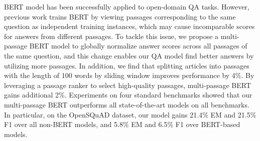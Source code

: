 BERT model has been successfully applied to open-domain QA tasks. However, previous work trains BERT by viewing passages corresponding to the same question as independent training instances, which may cause incomparable scores for answers from different passages. To tackle this issue, we propose a multi-passage BERT model to globally normalize answer scores across all passages of the same question, and this change enables our QA model find better answers by utilizing more passages. In addition, we find that splitting articles into passages with the length of 100 words by sliding window improves performance by 4\%. By leveraging a passage ranker to select high-quality passages, multi-passage BERT gains additional 2\%. Experiments on four standard benchmarks showed that our multi-passage BERT outperforms all state-of-the-art models on all benchmarks. In particular, on the OpenSQuAD dataset, our model gains 21.4\% EM and 21.5\% F1 over all non-BERT models, and 5.8\% EM and 6.5\% F1 over BERT-based models.